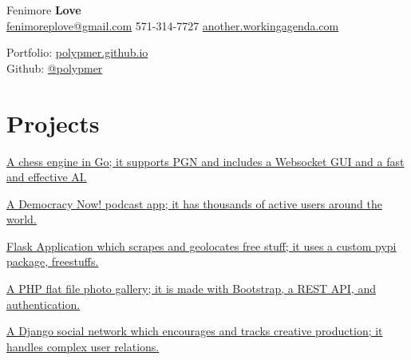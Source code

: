 \documentclass[]{deedy-resume-openfont}
\begin{document}
%
%

%
%
\begin{minipage}[t]{.6\textwidth}
{\Huge Fenimore {\textbf{Love}}}\\
\href{mailto:fenimoreplove@gmail.com}{fenimoreplove@gmail.com} \textbullet{} 571-314-7727 \textbullet{} \href{http://another.workingagenda.com}{another.workingagenda.com}\\
\end{minipage}
\hfill
\begin{minipage}[t]{.3\textwidth}
Portfolio: \href{https://polypmer.github.io}{polypmer.github.io}\\
Github: \href{https://github.com/polypmer}{@polypmer}
\end{minipage}
\namesection{}{} %

\section{Projects}
\href{https://ghess-chess.herokuapp.com/}{A chess engine in Go; it supports PGN and includes a Websocket GUI and a fast and effective AI.}
\sectionsep

\href{https://play.google.com/store/apps/details?id=com.workingagenda.democracydroid}{A Democracy Now! podcast app; it has thousands of active users around the world.}
\sectionsep

\href{http://treasure.plyp.org}{ Flask Application which scrapes and geolocates free stuff; it uses a custom pypi package, freestuffs.}
\sectionsep

\href{http://wink.plyp.org}{A PHP flat file photo gallery; it is made with Bootstrap, a REST API, and authentication.}
\sectionsep

\href{http://realmess.plyp.org/}{A Django social network which encourages and tracks creative production; it handles complex user relations.}
\sectionsep
\end{document}
